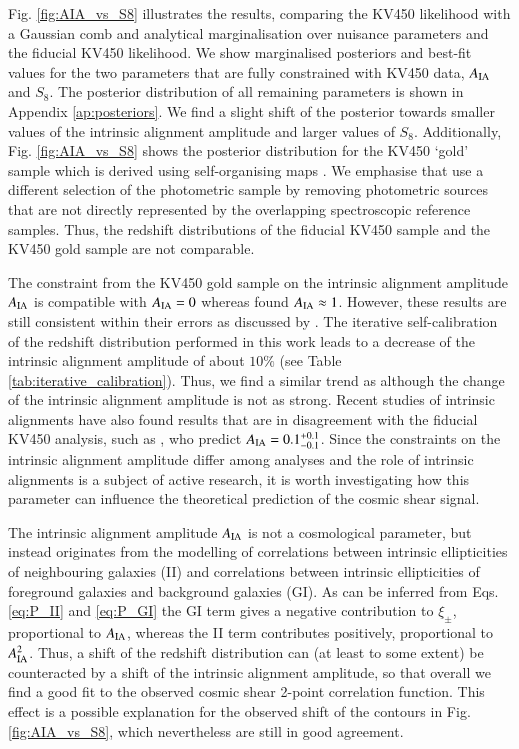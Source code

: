 \documentclass{aa}
\begin{document}
Fig. \ref{fig:AIA_vs_S8} illustrates the results, comparing the KV450 likelihood with a Gaussian comb and analytical marginalisation over nuisance parameters and the fiducial KV450 likelihood. We show marginalised posteriors and best-fit values for the two parameters that are fully constrained with KV450 data, $A_{\rm IA}$ and $S_8$. The posterior distribution of all remaining parameters is shown in Appendix \ref{ap:posteriors}. We find a slight shift of the posterior towards smaller values of the intrinsic alignment amplitude and larger values of $S_8$. Additionally, Fig. \ref{fig:AIA_vs_S8} shows the posterior distribution for the KV450 `gold' sample which is derived using self-organising maps \citep{wright_som_kv450}. We emphasise that \cite{wright_som_kv450} use a different selection of the photometric sample by removing photometric sources that are not directly represented by the overlapping spectroscopic reference samples. Thus, the redshift distributions of the fiducial KV450 sample and the KV450 gold sample are not comparable. 

The constraint from the KV450 gold sample on the intrinsic alignment amplitude $A_{\rm IA}$ is compatible with $A_{\rm IA} = 0$ whereas \cite{hildebrandt18} found $A_{\rm IA} \approx 1$. However, these results are still consistent within their errors as discussed by \cite{wright_som_kv450}. The iterative self-calibration of the redshift distribution performed in this work leads to a decrease of the intrinsic alignment amplitude of about $10\%$ (see Table \ref{tab:iterative_calibration}). Thus, we find a similar trend as \cite{wright_som_kv450} although the change of the intrinsic alignment amplitude is not as strong. Recent studies of intrinsic alignments have also found results that are in disagreement with the fiducial KV450 analysis, such as \cite{fortuna20}, who predict $A_{\rm IA} = 0.1 ^{+0.1}_{-0.1}$. Since the constraints on the intrinsic alignment amplitude differ among analyses and the role of intrinsic alignments is a subject of active research, it is worth investigating how this parameter can influence the theoretical prediction of the cosmic shear signal.

The intrinsic alignment amplitude $A_{\rm IA}$ is not a cosmological parameter, but instead originates from the modelling of correlations between intrinsic ellipticities of neighbouring galaxies (II) and correlations between intrinsic ellipticities of foreground galaxies and background galaxies (GI). As can be inferred from Eqs. \eqref{eq:P_II} and \eqref{eq:P_GI} the GI term gives a negative contribution to $\xi_\pm$, proportional to $A_{\rm IA}$, whereas the II term contributes positively, proportional to $A_{\rm IA}^2$. Thus, a shift of the redshift distribution can (at least to some extent) be counteracted by a shift of the intrinsic alignment amplitude, so that overall we find a good fit to the observed cosmic shear 2-point correlation function. This effect is a possible explanation for the observed shift of the contours in Fig. \ref{fig:AIA_vs_S8}, which nevertheless are still in good agreement. 
\end{document}
